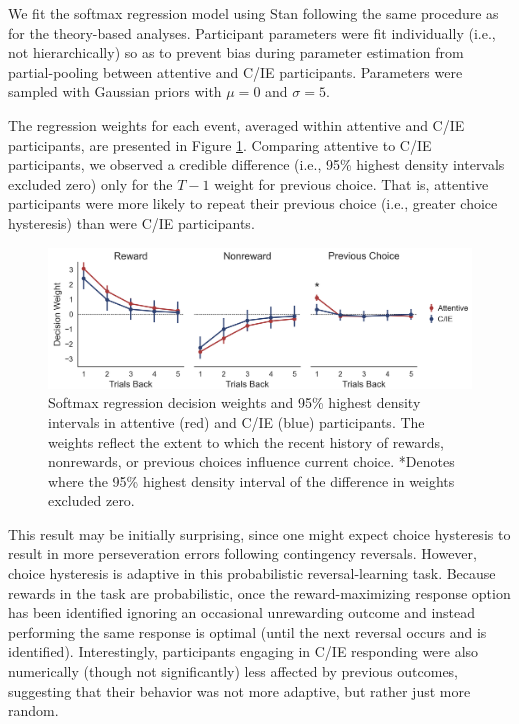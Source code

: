 \documentclass[a4paper,notitlepage,12pt]{article}
\begin{document}
We fit the softmax regression model using Stan following the same procedure as for the theory-based analyses. Participant parameters were fit individually (i.e., not hierarchically)  so as to prevent bias during parameter estimation from partial-pooling between attentive and C/IE participants. Parameters were sampled with Gaussian priors with $\mu = 0$ and $\sigma = 5$.

The regression weights for each event, averaged within attentive and C/IE participants, are presented in Figure \ref{fig:regression}. Comparing attentive to C/IE participants, we observed a credible difference (i.e., 95\% highest density intervals excluded zero) only for the $T-1$ weight for previous choice. That is, attentive participants were more likely to repeat their previous choice (i.e., greater choice hysteresis) than were C/IE participants.

\begin{figure}[!t]
    \includegraphics[width=16cm]{../figures/main_03c.png}
    \centering
    \caption{Softmax regression decision weights and 95\% highest density intervals in attentive (red) and C/IE (blue) participants. The weights reflect the extent to which the recent history of rewards, nonrewards, or previous choices influence current choice. *Denotes where the 95\% highest density interval of the difference in weights excluded zero.}
    \label{fig:regression}
\end{figure}

This result may be initially surprising, since one might expect choice hysteresis to result in more perseveration errors following contingency reversals. However, choice hysteresis is adaptive in this probabilistic reversal-learning task. Because rewards in the task are probabilistic, once the reward-maximizing response option has been identified ignoring an occasional unrewarding outcome and instead performing the same response is optimal (until the next reversal occurs and is identified). Interestingly, participants engaging in C/IE responding were also numerically (though not significantly) less affected by previous outcomes, suggesting that their behavior was not more adaptive, but rather just more random.
\end{document}
